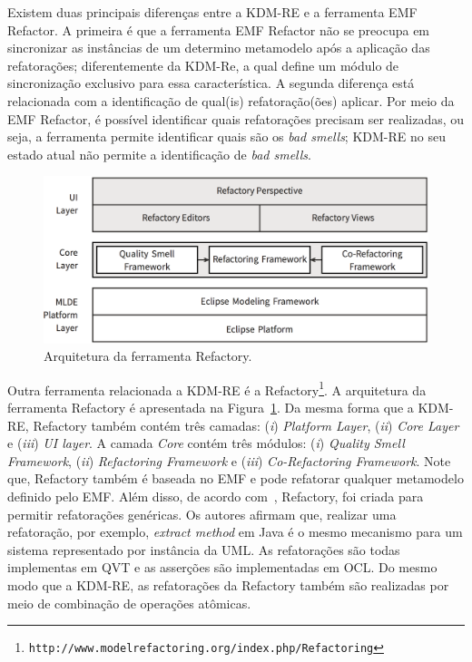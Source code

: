 Existem duas principais diferenças entre a KDM-RE e a ferramenta EMF Refactor. A primeira é que a ferramenta EMF Refactor não se preocupa em sincronizar as instâncias de um determino metamodelo após a aplicação das refatorações; diferentemente da KDM-Re, a qual define um módulo de sincronização exclusivo para essa característica. A segunda diferença está relacionada com a identificação de qual(is) refatoração(ões) aplicar. Por meio da EMF Refactor, é possível identificar quais refatorações precisam ser realizadas, ou seja, a ferramenta permite identificar quais são os \textit{bad smells}; KDM-RE no seu estado atual não permite a identificação de \textit{bad smells}.


\begin{figure}[h]
	\centering
	\caption{Arquitetura da ferramenta Refactory.}
	\label{fig:refactory}
	\includegraphics[scale=0.2]{images/refactoryArchitecture}
\end{figure}

Outra ferramenta relacionada a KDM-RE é a Refactory\footnote{\texttt{http://www.modelrefactoring.org/index.php/Refactoring}}. A arquitetura da ferramenta Refactory é apresentada na Figura~\ref{fig:refactory}. Da mesma forma que a KDM-RE, Refactory também contém três camadas: (\textit{i}) \textit{Platform Layer}, (\textit{ii}) \textit{Core Layer} e (\textit{iii}) \textit{UI layer}. A camada \textit{Core} contém três módulos: (\textit{i}) \textit{Quality Smell Framework}, (\textit{ii}) \textit{Refactoring Framework} e (\textit{iii}) \textit{Co-Refactoring Framework}. Note que, Refactory também é baseada no EMF e pode refatorar qualquer metamodelo definido pelo EMF. Além disso, de acordo com~, Refactory, foi criada para permitir refatorações genéricas. Os autores afirmam que, realizar uma refatoração, por exemplo, \textit{extract method} em Java é o mesmo mecanismo para um sistema representado por instância da UML. As refatorações são todas implementas em QVT e as asserções são implementadas em OCL. Do mesmo modo que a KDM-RE, as refatorações da Refactory também são realizadas por meio de combinação de operações atômicas.




